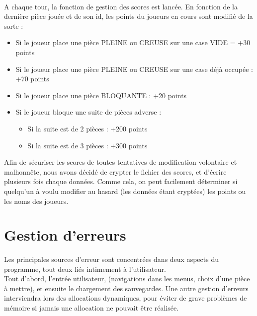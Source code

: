 \documentclass{report}
\begin{document}
        \paragraph*{} %
	A chaque tour, la fonction de gestion des scores est lancée. En fonction de la dernière pièce jouée et de son id, les points du joueurs en cours sont modifié de la sorte : 
	\begin{itemize}
		\item Si le joueur place une pièce PLEINE ou CREUSE sur une case VIDE = +30 points
		\item Si le joueur place une pièce PLEINE ou CREUSE sur une case déjà occupée : +70 points
		\item Si le joueur place une pièce BLOQUANTE : +20 points
		\item Si le joueur bloque une suite de pièces adverse :
		\begin{itemize}
			\item Si la suite est de 2 pièces : +200 points
			\item Si la suite est de 3 pièces : +300 points
		\end{itemize}
	\end{itemize}
	Afin de sécuriser les scores de toutes tentatives de modification volontaire et malhonnête, nous avons décidé de crypter le fichier des scores, et d'écrire plusieurs fois chaque données. Comme cela, on peut facilement déterminer si quelqu'un à voulu modifier au hasard (les données étant cryptées) les points ou les noms des joueurs.

    \section*{Gestion d'erreurs} %
        \paragraph*{}
        Les principales sources d'erreur sont concentrées dans deux aspects du programme, tout deux liés intimement à l'utilisateur.\\
        Tout d'abord, l'entrée utilisateur, (navigations dans les menus, choix d'une pièce à mettre), et ensuite le chargement des sauvegardes.
        Une autre gestion d'erreurs interviendra lors des allocations dynamiques, pour éviter de grave problèmes de mémoire si jamais une allocation ne pouvait être réalisée.
\end{document}
